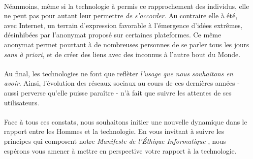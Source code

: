 \paragraph{} Néanmoins, même si la technologie à permis ce rapprochement des individus, elle ne peut pas pour
autant leur permettre \emph{de s'accorder}. Au contraire elle à été, avec Internet, un terrain d'expression
favorable à l'émergence d'idées extrêmes, désinhibées par l'anonymat proposé sur certaines plateformes. Ce même
anonymat permet pourtant à de nombreuses personnes de se parler tous les jours \emph{sans à priori}, et de créer
des liens avec des inconnus à l'autre bout du Monde.

\paragraph{} Au final, les technologies ne font que reflèter \emph{l'usage que nous souhaitons en avoir}. 
Ainsi, l'évolution des réseaux sociaux au cours de ces dernières années - aussi perverse qu'elle puisse paraître -
n'à fait que suivre les attentes de ses utilisateurs.

\paragraph{} Face à tous ces constats, nous souhaitons initier une nouvelle dynamique dans le rapport entre les
Hommes et la technologie. En vous invitant à suivre les principes qui composent notre \emph{Manifeste de l'Éthique
Informatique} \cite{FriesMilano0}, nous espérons vous amener à mettre en perspective votre rapport à la technologie.

